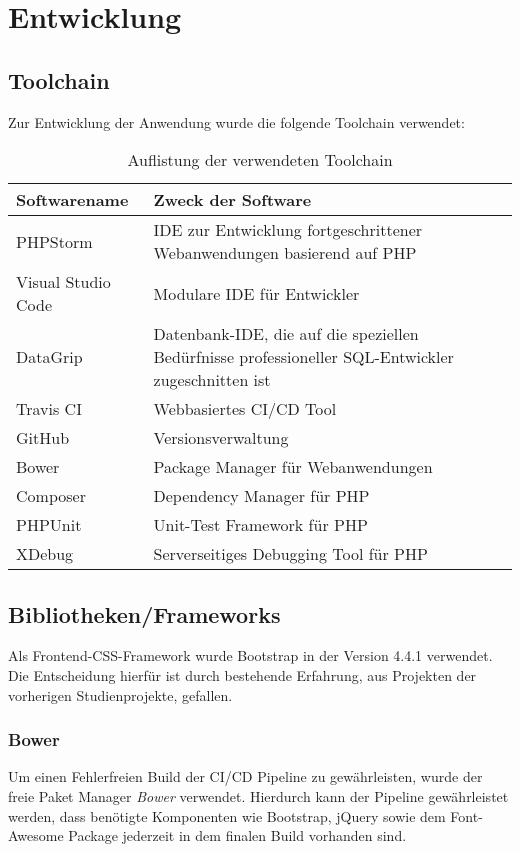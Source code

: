 \chapter{Entwicklung}\label{ch:entwicklung}

\section{Toolchain}\label{sec:toolchain}
Zur Entwicklung der Anwendung wurde die folgende Toolchain verwendet:

\begin{table}[htb]
\centering
\begin{tabular}{p{5cm}  p{9cm}}
\hline
\textbf{Softwarename} & \textbf{Zweck der Software}\\
\hline
PHPStorm & IDE zur Entwicklung fortgeschrittener Webanwendungen basierend auf PHP\\
\hline
Visual Studio Code & Modulare IDE für Entwickler\\ 
\hline
DataGrip & Datenbank-IDE, die auf die speziellen Bedürfnisse professioneller SQL-Entwickler zugeschnitten ist\\
\hline
Travis CI & Webbasiertes CI/CD Tool\\
\hline
GitHub & Versionsverwaltung\\
\hline
Bower & Package Manager für Webanwendungen\\
\hline
Composer & Dependency Manager für PHP \\
\hline
PHPUnit & Unit-Test Framework für PHP \\ 
\hline
XDebug & Serverseitiges Debugging Tool für PHP \\
\hline
\end{tabular}
\caption{Auflistung der verwendeten Toolchain}
\end{table}

\section{Bibliotheken/Frameworks}\label{sec:bibliotheken/frameworks}
Als Frontend-CSS-Framework wurde Bootstrap in der Version 4.4.1 verwendet. Die Entscheidung hierfür ist durch bestehende Erfahrung, aus Projekten der vorherigen Studienprojekte, gefallen.
\subsection{Bower}\label{subsec:bower}
Um einen Fehlerfreien Build der CI/CD Pipeline zu gewährleisten, wurde der freie Paket Manager \emph{Bower} verwendet. Hierdurch kann der Pipeline gewährleistet werden, dass benötigte Komponenten wie Bootstrap, jQuery sowie dem Font-Awesome Package jederzeit in dem finalen Build vorhanden sind.
